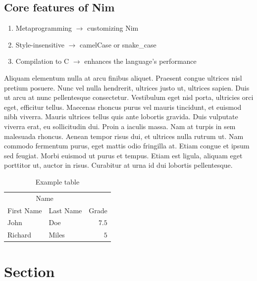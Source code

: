 \documentclass[10pt, a4paper, twocolumn]{article} %
\begin{document}
\subsection{Core features of Nim}

\begin{enumerate}
	\item Metaprogramming $\longrightarrow$ customizing Nim
	\item Style-insensitive $\longrightarrow$ camelCase or snake\_case
	\item Compilation to C $\longrightarrow$ enhances the language's performance
\end{enumerate}

Aliquam elementum nulla at arcu finibus aliquet. Praesent congue ultrices nisl pretium posuere. Nunc vel nulla hendrerit, ultrices justo ut, ultrices sapien. Duis ut arcu at nunc pellentesque consectetur. Vestibulum eget nisl porta, ultricies orci eget, efficitur tellus. Maecenas rhoncus purus vel mauris tincidunt, et euismod nibh viverra. Mauris ultrices tellus quis ante lobortis gravida. Duis vulputate viverra erat, eu sollicitudin dui. Proin a iaculis massa. Nam at turpis in sem malesuada rhoncus. Aenean tempor risus dui, et ultrices nulla rutrum ut. Nam commodo fermentum purus, eget mattis odio fringilla at. Etiam congue et ipsum sed feugiat. Morbi euismod ut purus et tempus. Etiam est ligula, aliquam eget porttitor ut, auctor in risus. Curabitur at urna id dui lobortis pellentesque.

\begin{table}
	\caption{Example table}
	\centering
	\begin{tabular}{llr}
		\toprule
		\multicolumn{2}{c}{Name} \\
		\cmidrule(r){1-2}
		First Name & Last Name & Grade \\
		\midrule
		John & Doe & $7.5$ \\
		Richard & Miles & $5$ \\
		\bottomrule
	\end{tabular}
\end{table}


\section{Section}
\end{document}
